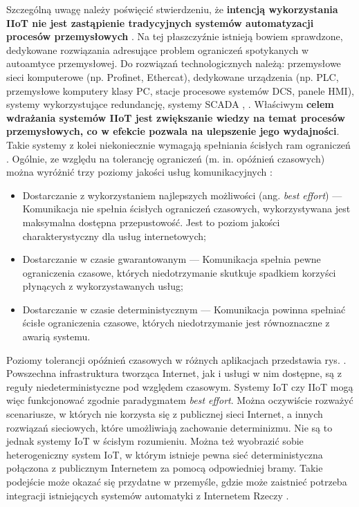 \documentclass[a4paper, 12pt, twoside]{article}
\begin{document}
Szczególną uwagę należy poświęcić stwierdzeniu, że \textbf{intencją wykorzystania IIoT nie 
jest zastąpienie tradycyjnych systemów automatyzacji procesów przemysłowych} \cite{iiot-challenges-opportunities-directions}. 
Na tej płaszczyźnie istnieją bowiem sprawdzone, dedykowane rozwiązania adresujące
problem ograniczeń spotykanych w autoamtyce przemysłowej. Do rozwiązań technologicznych należą: przemysłowe sieci komputerowe
(np. Profinet, Ethercat), dedykowane urządzenia 
(np. PLC, przemysłowe komputery klasy PC, stacje procesowe systemów DCS, panele HMI),
systemy wykorzystujące redundancję, systemy SCADA \cite{isp}, \cite{systemy-automatyki-przemyslowej}.
Właściwym \textbf{celem wdrażania systemów IIoT jest zwiększanie wiedzy na temat procesów
przemysłowych, co w efekcie pozwala na ulepszenie jego wydajności}. Takie systemy
z kolei niekoniecznie wymagają spełniania ścisłych ram ograniczeń 
\cite{iiot-challenges-opportunities-directions}. 
Ogólnie, ze względu na tolerancję ograniczeń (m. in. opóźnień czasowych) można 
wyróżnić trzy poziomy jakości usług komunikacyjnych \cite{iot-hype-to-reality}: 
\begin{itemize}
    \item Dostarczanie z wykorzystaniem najlepszych możliwości (ang. \emph{best effort})
    --- Komunikacja nie spełnia ścisłych ograniczeń czasowych, wykorzystywana jest 
    maksymalna dostępna przepustowość. Jest to poziom jakości charakterystyczny
    dla usług internetowych;
    \item Dostarczanie w czasie gwarantowanym
    --- Komunikacja spełnia pewne ograniczenia czasowe, których niedotrzymanie
    skutkuje spadkiem korzyści płynących z wykorzystawanych usług;
    \item Dostarczanie w czasie deterministycznym
    --- Komunikacja powinna spełniać ścisłe ograniczenia czasowe,
    których niedotrzymanie jest równoznaczne z awarią systemu.
\end{itemize}
Poziomy tolerancji opóźnień czasowych w różnych aplikacjach przedstawia rys. .
Powszechna infrastruktura tworząca Internet, jak i usługi w nim dostępne, są z reguły
niedeterministyczne pod względem czasowym. Systemy IoT czy IIoT mogą więc
funkcjonować zgodnie paradygmatem \emph{best effort}. Można oczywiście rozważyć
scenariusze, w których nie korzysta się z publicznej sieci Internet, a innych
rozwiązań sieciowych, które umożliwiają zachowanie determinizmu. Nie są to jednak
systemy IoT w ścisłym rozumieniu. Można też wyobrazić sobie heterogeniczny system
IoT, w którym istnieje pewna sieć deterministyczna połączona z publicznym Internetem
za pomocą odpowiedniej bramy. Takie podejście może okazać się przydatne w przemyśle, gdzie 
może zaistnieć potrzeba integracji istniejących systemów automatyki z Internetem Rzeczy \cite{iiot-design-and-impl-gateway}.
\end{document}
